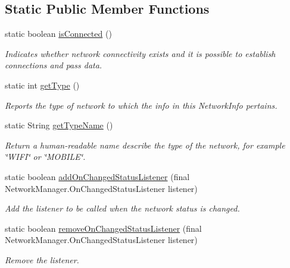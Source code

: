 \subsection*{Static Public Member Functions}
\begin{DoxyCompactItemize}
\item 
static boolean \hyperlink{classcom_1_1toast_1_1android_1_1gamebase_1_1_gamebase_1_1_network_a794a5c628defa296e0feccd47fcd1113}{is\+Connected} ()
\begin{DoxyCompactList}\small\item\em Indicates whether network connectivity exists and it is possible to establish connections and pass data. \end{DoxyCompactList}\item 
static int \hyperlink{classcom_1_1toast_1_1android_1_1gamebase_1_1_gamebase_1_1_network_a266dfc4b57f7c115e6323b37841f9f83}{get\+Type} ()
\begin{DoxyCompactList}\small\item\em Reports the type of network to which the info in this Network\+Info pertains. \end{DoxyCompactList}\item 
static String \hyperlink{classcom_1_1toast_1_1android_1_1gamebase_1_1_gamebase_1_1_network_afc9b9c5fd3623a1bc4efb56deab90dbf}{get\+Type\+Name} ()
\begin{DoxyCompactList}\small\item\em Return a human-\/readable name describe the type of the network, for example \char`\"{}\+W\+I\+F\+I\char`\"{} or \char`\"{}\+M\+O\+B\+I\+L\+E\char`\"{}. \end{DoxyCompactList}\item 
static boolean \hyperlink{classcom_1_1toast_1_1android_1_1gamebase_1_1_gamebase_1_1_network_a787c04bc186b6be1c1edab693496a6cd}{add\+On\+Changed\+Status\+Listener} (final Network\+Manager.\+On\+Changed\+Status\+Listener listener)
\begin{DoxyCompactList}\small\item\em Add the listener to be called when the network status is changed. \end{DoxyCompactList}\item 
static boolean \hyperlink{classcom_1_1toast_1_1android_1_1gamebase_1_1_gamebase_1_1_network_a295dcc9a385185370586734384c49c43}{remove\+On\+Changed\+Status\+Listener} (final Network\+Manager.\+On\+Changed\+Status\+Listener listener)
\begin{DoxyCompactList}\small\item\em Remove the listener. \end{DoxyCompactList}\end{DoxyCompactItemize}


